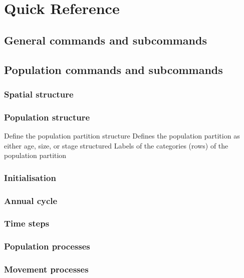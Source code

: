 \section{Quick Reference\label{sec:quick-reference}}

\subsection*{General commands and subcommands}
\subsection*{Population commands and subcommands}
\subsubsection*{Spatial structure}
\subsubsection*{Population structure}
 {Define the population partition structure}
 {Defines the population partition as either age, size, or stage structured}
 {Labels of the categories (rows) of the population partition}
\subsubsection*{Initialisation}
\subsubsection*{Annual cycle}
\subsubsection*{Time steps}
\subsubsection*{Population processes}
\subsubsection*{Movement processes}
